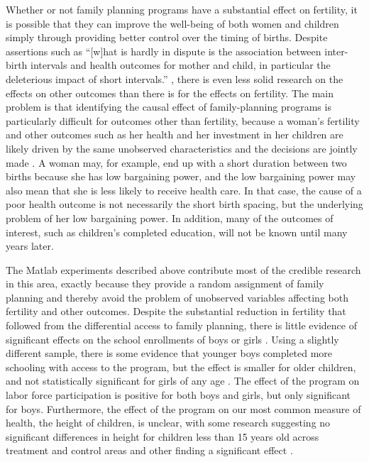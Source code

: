 \documentclass[letterpaper,12pt]{article}
\begin{document}
Whether or not family planning programs have a substantial effect on
fertility, it is possible that they can improve the well-being of both
women and children simply through providing better control over the
timing of births. 
Despite assertions such as ``{[}w{]}hat is hardly in dispute is the
association between inter-birth intervals and health outcomes for mother
and child, in particular the deleterious impact of short intervals.''
\citep[p. 
175]{Casterline2016}, there is even less solid research on the effects
on other outcomes than there is for the effects on fertility. 
The main problem is that identifying the causal effect of
family-planning programs is particularly difficult for outcomes other
than fertility, because a woman's fertility and other outcomes such as
her health and her investment in her children are likely driven by the
same unobserved characteristics and the decisions are jointly made
\citep{Schultz2005}. 
A woman may, for example, end up with a short duration between two
births because she has low bargaining power, and the low bargaining
power may also mean that she is less likely to receive health care. 
In that case, the cause of a poor health outcome is not necessarily the
short birth spacing, but the underlying problem of her low bargaining
power. 
In addition, many of the outcomes of interest, such as children's
completed education, will not be known until many years later.

The Matlab experiments described above contribute most of the credible
research in this area, exactly because they provide a random assignment
of family planning and thereby avoid the problem of unobserved variables
affecting both fertility and other outcomes. 
Despite the substantial reduction in fertility that followed from the
differential access to family planning, there is little evidence of
significant effects on the school enrollments of boys or girls
\citep{Sinha2005}. 
Using a slightly different sample, there is some evidence that younger
boys completed more schooling with access to the program, but the effect
is smaller for older children, and not statistically significant for
girls of any age \citep{Joshi2007}. 
The effect of the program on labor force participation is positive for
both boys and girls, but only signiﬁcant for boys. 
Furthermore, the effect of the program on our most common measure of
health, the height of children, is unclear, with some research
suggesting no significant differences in height for children less than
15 years old across treatment and control areas \citep{Joshi2007} and
other finding a significant effect \citep{Barham2012}.
\end{document}
